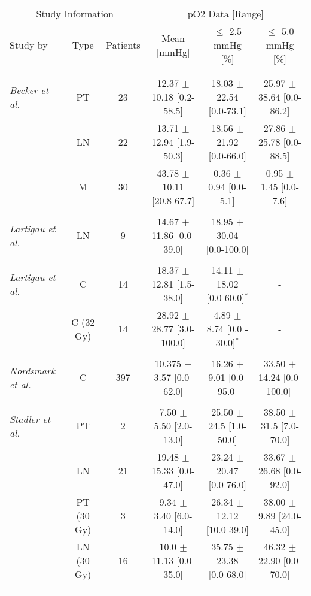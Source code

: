 \begin{sidewaystable}[p]
\centering
\small
\begin{tabular}{lccccc}
\toprule
\multicolumn{3}{c}{Study Information} & \multicolumn{3}{c}{pO2 Data [Range]}\\
\cmidrule(r){1-3} \cmidrule(r){4-6}
Study by & Type & Patients & Mean [mmHg] & $\leq$ 2.5 mmHg [\%] & $\leq$ 5.0 mmHg [\%]\\\\
\midrule\\
\textit{Becker et al.}\cite{pmid9765692}		& PT & 23 &  12.37 $\pm$ 10.18 [0.2-58.5] & 18.03 $\pm$ 22.54 [0.0-73.1] & 25.97 $\pm$ 38.64 [0.0-86.2]\\
									& LN & 22 &  13.71 $\pm$ 12.94 [1.9-50.3] & 18.56 $\pm$ 21.92 [0.0-66.0] & 27.86 $\pm$ 25.78 [0.0-88.5]\\
									& M & 30 &  43.78 $\pm$ 10.11 [20.8-67.7] & 0.36 $\pm$ 0.94 [0.0-5.1] & 0.95 $\pm$ 1.45 [0.0-7.6]\\\\
\textit{Lartigau et al.}\cite{pmid8453553}		& LN & 9 & 14.67 $\pm$ 11.86 [0.0-39.0] & 18.95 $\pm$ 30.04 [0.0-100.0] & -\\\\
\textit{Lartigau et al.}\cite{pmid9797698}		& C & 14 & 18.37 $\pm$ 12.81 [1.5-38.0] & 14.11 $\pm$ 18.02 [0.0-60.0]$^*$& -\\
									& C (32 Gy) & 14 & 28.92 $\pm$ 28.77 [3.0-100.0] &  4.89 $\pm$ 8.74 [0.0 - 30.0]$^*$& -\\\\
\textit{Nordsmark et al.}\cite{pmid16098619}	& C & 397 & 10.375 $\pm$ 3.57 [0.0-62.0] & 16.26 $\pm$ 9.01 [0.0-95.0] & 33.50 $\pm$ 14.24 [0.0-100.0]]\\\\
\textit{Stadler et al.}\cite{pmid9783887}		& PT & 2 & 7.50 $\pm$ 5.50 [2.0-13.0] & 25.50 $\pm$ 24.5 [1.0-50.0] & 38.50 $\pm$ 31.5 [7.0-70.0]\\
									& LN & 21 &  19.48 $\pm$ 15.33 [0.0-47.0] & 23.24 $\pm$ 20.47 [0.0-76.0] & 33.67 $\pm$ 26.68 [0.0-92.0]\\
									& PT (30 Gy) & 3 &  9.34 $\pm$ 3.40 [6.0-14.0] & 26.34 $\pm$ 12.12 [10.0-39.0] & 38.00 $\pm$ 9.89 [24.0-45.0]\\
									& LN (30 Gy) & 16 &  10.0 $\pm$ 11.13 [0.0-35.0] & 35.75 $\pm$ 23.38 [0.0-68.0] & 46.32 $\pm$ 22.90 [0.0-70.0]\\\\
\bottomrule\\

\end{tabular}
\end{sidewaystable}
